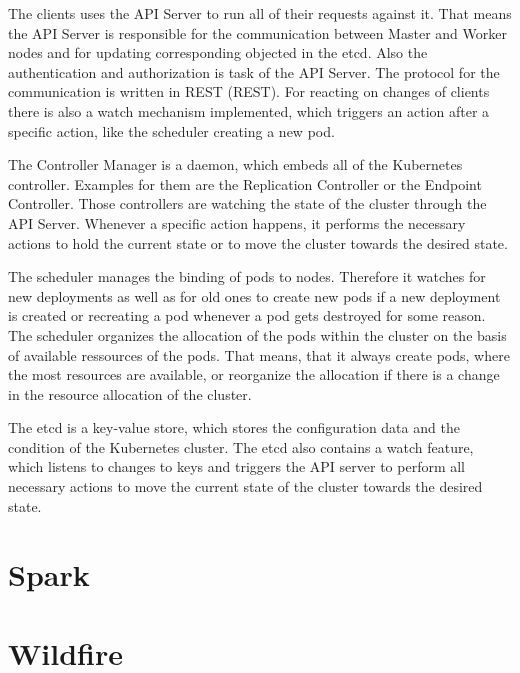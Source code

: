 The clients uses the API Server to run all of their requests against it. That means the API Server is responsible for the communication between Master and Worker nodes and for updating corresponding objected in the etcd. Also the authentication and authorization is task of the API Server. The protocol for the communication is written in \acs{REST} (\acl{REST}). For reacting on changes of clients there is also a watch mechanism implemented, which triggers an action after a specific action, like the scheduler creating a new pod.%

The Controller Manager is a daemon, which embeds all of the Kubernetes controller. Examples for them are the Replication Controller or the Endpoint Controller. Those controllers are watching the state of the cluster through the API Server. Whenever a specific action happens, it performs the necessary actions to hold the current state or to move the cluster towards the desired state.

The scheduler manages the binding of pods to nodes. Therefore it watches for new deployments as well as for old ones to create new pods if a new deployment is created or recreating a pod whenever a pod gets destroyed for some reason. The scheduler organizes the allocation of the pods within the cluster on the basis of available ressources of the pods. That means, that it always create pods, where the most resources are available, or reorganize the allocation if there is a change in the resource allocation of the cluster.%

The etcd is a key-value store, which stores the configuration data and the condition of the Kubernetes cluster. The etcd also contains a watch feature, which listens to changes to keys and triggers the API server to perform all necessary actions to move the current state of the cluster towards the desired state.



\section{Spark}

\section{Wildfire}
